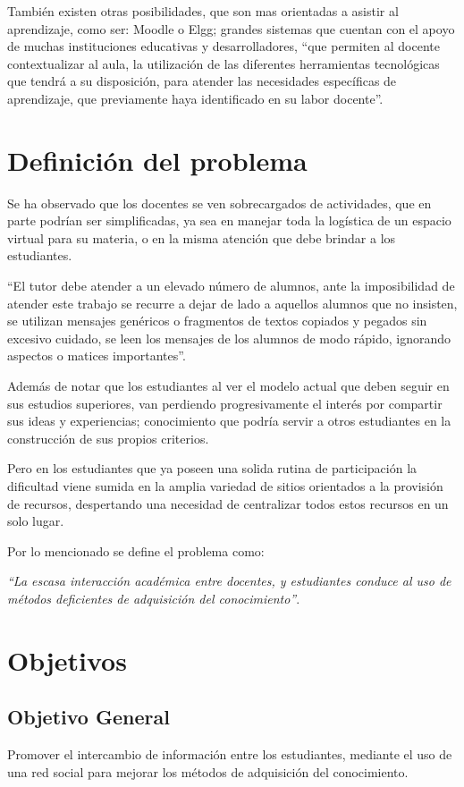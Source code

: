 También existen otras posibilidades, que son mas orientadas a asistir al
aprendizaje, como ser: Moodle o Elgg; grandes sistemas que cuentan con el apoyo
de muchas instituciones educativas y desarrolladores, “que permiten al docente
contextualizar al aula, la utilización de las diferentes herramientas
tecnológicas que tendrá a su disposición, para atender las necesidades
específicas de aprendizaje, que previamente haya identificado en su labor
docente”\cite{Gonzalez}.

\section{Definición del problema}
Se ha observado que los docentes se ven sobrecargados de actividades, que en
parte podrían ser simplificadas, ya sea en manejar toda la logística de un
espacio virtual para su materia, o en la misma atención que debe brindar a los
estudiantes.

“El tutor debe atender a un elevado número de alumnos, ante la imposibilidad de
atender este trabajo se recurre a dejar de lado a aquellos alumnos que no
insisten, se utilizan mensajes genéricos o fragmentos de textos copiados y
pegados sin excesivo cuidado, se leen los mensajes de los alumnos de modo
rápido, ignorando aspectos o matices importantes”\cite{Bartolome}.

Además de notar que los estudiantes al ver el modelo actual que deben seguir en
sus estudios superiores, van perdiendo progresivamente el interés por compartir
sus ideas y experiencias; conocimiento que podría servir a otros estudiantes en
la construcción de sus propios criterios.

Pero en los estudiantes que ya poseen una solida rutina de participación la
dificultad viene sumida en la amplia variedad de sitios orientados a la
provisión de recursos, despertando una necesidad de centralizar todos estos
recursos en un solo lugar.

Por lo mencionado se define el problema como:

\emph{“La escasa interacción académica entre docentes, y estudiantes conduce al
uso de métodos deficientes de adquisición del conocimiento”}.

\section{Objetivos}

\subsection{Objetivo General}
Promover el intercambio de información entre los estudiantes, mediante el uso
de una red social para mejorar los métodos de adquisición del conocimiento.

